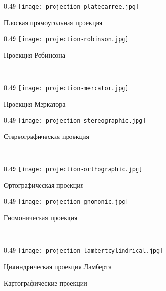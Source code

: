 \begin{figure}[p]
    \centering
    \begin{subcaptionblock}[b]{0.49\tw}
        \centering
        \texttt{[image: projection-platecarree.jpg]}
        \caption{Плоская прямоугольная проекция}
        \label{pic:map-projection-plate-carree}
    \end{subcaptionblock}
    \hfill
    \begin{subcaptionblock}[b]{0.49\tw}
        \centering
        \texttt{[image: projection-robinson.jpg]}
        \caption{Проекция Робинсона}
        \label{pic:map-projection-plate-robinson}
    \end{subcaptionblock}
    \\
    \begin{subcaptionblock}[b]{0.49\tw}
        \centering
        \texttt{[image: projection-mercator.jpg]}
        \caption{Проекция Меркатора}
        \label{pic:map-projection-mercator}
    \end{subcaptionblock}
    \hfill
    \begin{subcaptionblock}[b]{0.49\tw}
        \centering
        \texttt{[image: projection-stereographic.jpg]}
        \caption{Стереографическая проекция}
        \label{pic:map-projection-stereographic}
    \end{subcaptionblock}
    \\
    \begin{subcaptionblock}[b]{0.49\tw}
        \centering
        \texttt{[image: projection-orthographic.jpg]}
        \caption{Ортографическая проекция}
        \label{pic:map-projection-orthographic}
    \end{subcaptionblock}
    \hfill
    \begin{subcaptionblock}[b]{0.49\tw}
        \centering
        \texttt{[image: projection-gnomonic.jpg]}
        \caption{Гномоническая проекция}
        \label{pic:map-projection-gnomonic}
    \end{subcaptionblock}
    \\
    \begin{subcaptionblock}[b]{0.49\tw}
        \centering
        \texttt{[image: projection-lambertcylindrical.jpg]}
        \caption{Цилиндрическая проекция Ламберта}
        \label{pic:map-projection-lambertcylindrical}
    \end{subcaptionblock}
    \caption{Картографические проекции}
    \label{pic:map-projection}
\end{figure}
